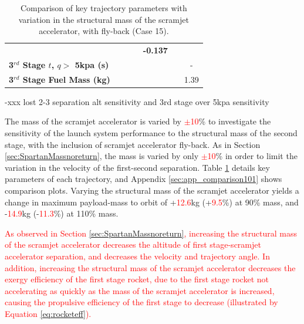 \begin{table}[ht]
\begin{tabular}{l c c c c c c}
	& \textbf{\thirddExergyEffmSPARTANStandard}
	& \textbf{\thirddExergyEffmSPARTANOneHundredFive}
	& \textbf{\thirddExergyEffmSPARTANOneHundredTen}
	& \textbf{-0.137}
	\\
	\textbf{3$^{rd}$ Stage $t$, $q >$ 5kpa (s)}
	& \thirdqOverFivemSPARTANNinety
	& \thirdqOverFivemSPARTANNinetyFive
	& \thirdqOverFivemSPARTANStandard
	& \thirdqOverFivemSPARTANOneHundredFive
	& \thirdqOverFivemSPARTANOneHundredTen
	& -
	\\
	\textbf{3$^{rd}$ Stage Fuel Mass (kg)}
	& \thirdmFuelmSPARTANNinety
	& \thirdmFuelmSPARTANNinetyFive
	& \thirdmFuelmSPARTANStandard
	& \thirdmFuelmSPARTANOneHundredFive
	& \thirdmFuelmSPARTANOneHundredTen
	&1.39
	\\
	\hline 
\end{tabular} 
\caption{Comparison of key trajectory parameters with variation in the structural mass of the scramjet accelerator, with fly-back (Case 15).}
\label{tab:comparison101}
\end{table}

-xxx lost 2-3 separation alt sensitivity and 3rd stage over 5kpa sensitivity

The mass of the scramjet accelerator is varied by \textcolor{red}{$\pm$10}\% to investigate the sensitivity of the launch system performance to the structural mass of the second stage, with the inclusion of scramjet accelerator fly-back. As in Section \ref{sec:SpartanMassnoreturn}, the mass is varied by only \textcolor{red}{$\pm$10}\% in order to limit the variation in the velocity of the first-second separation.
Table \ref{tab:comparison101} details key parameters of each trajectory, and Appendix \ref{sec:app_comparison101} shows comparison plots.
Varying the structural mass of the scramjet accelerator yields a change in maximum payload-mass to orbit of +\textcolor{red}{12.6}kg (+\textcolor{red}{9.5}\%) at 90\% mass, and -\textcolor{red}{14.9}kg (-\textcolor{red}{11.3}\%) at 110\% mass. 


\textcolor{red}{
As observed in Section \ref{sec:SpartanMassnoreturn}, increasing the structural mass of the scramjet accelerator decreases the altitude of first stage-scramjet accelerator separation, and decreases the velocity and trajectory angle. 
In addition, increasing the structural mass of the scramjet accelerator decreases the exergy efficiency of the first stage rocket, due to the first stage rocket not accelerating as quickly as the mass of the scramjet accelerator is increased, causing the propulsive efficiency of the first stage to decrease (illustrated by Equation \ref{eq:rocketeff}).}

